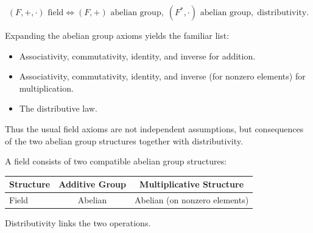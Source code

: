 \begin{remark*}
\[ (F,+,\cdot)\text{ field} \iff (F,+)\text{ abelian group},\; (F^*,\cdot)\text{ abelian group},\; \text{distributivity}. \]
\end{remark*}

\begin{remark*}[Flash]
\end{remark*}

\begin{remark*}
Expanding the abelian group axioms yields the familiar list:

\begin{itemize}
\item Associativity, commutativity, identity, and inverse for addition.
\item Associativity, commutativity, identity, and inverse (for nonzero elements)
      for multiplication.
\item The distributive law.
\end{itemize}

Thus the usual field axioms are not independent assumptions,
but consequences of the two abelian group structures together with distributivity.
\end{remark*}

\begin{remark*}
A field consists of two compatible abelian group structures:

\begin{center}
\begin{tabular}{l|c|c}
Structure & Additive Group & Multiplicative Structure \\
\hline
Field & Abelian & Abelian (on nonzero elements)
\end{tabular}
\end{center}

Distributivity links the two operations.
\end{remark*}
